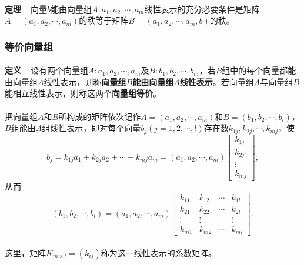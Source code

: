 \paragraph{}
\textbf{定理~~}向量$b$能由向量组$A: a_1,a_2,\cdots,a_m$线性表示的充分必要条件是矩阵$A=(a_1,a_2,\cdots,a_m)$的秩等于矩阵$B=(a_1,a_2,\cdots,a_m,b)$的秩。

\subsubsection{等价向量组}
\paragraph{}
\textbf{定义~~}设有两个向量组$A: a_1,a_2,\cdots,a_m$及$B: b_1,b_2,\cdots,b_m$，若$B$组中的每个向量都能由向量组$A$线性表示，则称\textbf{向量组$B$能由向量组$A$线性表示}。若向量组$A$与向量组$B$能相互线性表示，则称这两个\textbf{向量组等价}。

\paragraph{}
把向量组$A$和$B$所构成的矩阵依次记作$A=(a_1,a_2,\cdots,a_m)$和$B=(b_1,b_2,\cdots,b_l)$，$B$组能由$A$组线性表示，即对每个向量$b_j(j=1,2,\cdots,l)$存在数$k_{1j},k_{2j},\cdots,k_{mj}$，使
\begin{equation*}
  b_j = k_{1j}a_1 + k_{2j}a_2 + \cdots + k_{mj}a_m = (a_1,a_2,\cdots,a_m)\left[\begin{array}{c}
    k_{1j} \\
    k_{2j} \\
    \vdots \\
    k_{mj}
  \end{array}\right],
\end{equation*}
从而
\begin{equation*}
  (b_1,b_2,\cdots,b_l) = (a_1,a_2,\cdots,a_m)\left[\begin{array}{cccc}
    k_{11} & k_{12} & \cdots & k_{1l} \\
    k_{21} & k_{22} & \cdots & k_{2l} \\
    \vdots & \vdots &  & \vdots \\
    k_{m1} & k_{m2} & \cdots & k_{ml}
  \end{array}\right].
\end{equation*}

\paragraph{}
这里，矩阵$K_{m\times l} = (k_{ij})$称为这一线性表示的系数矩阵。


